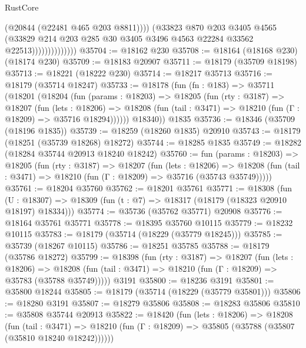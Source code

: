 \begin{lexlean}{RustCore}
\begin{coremodule}
                                (@20844 (@22481 @465 @203 @8811))))
                            (@33823
                              @870
                              @203
                              @3405
                              @4565
                              (@33829
                                @214
                                @203
                                @285
                                @30
                                @3405
                                @3496
                                @4563
                                @22284
                                @33562
                                @22513))))))))))))))
@35704 := @18162 @230
@35708 := @18164 (@18168 @230) (@18174 @230)
@35709 := @18183 @20907
@35711 := @18179 (@35709 @18198)
@35713 := @18221 (@18222 @230)
@35714 := @18217 @35713
@35716 := @18179 (@35714 @18247)
@35733 := @18178
    (fun (fn : @183) =>
    @35711
      (@18201
        (@18204
          (fun (params : @18203) =>
          @18205
            (fun (rty : @3187) =>
            @18207
              (fun (lets : @18206) =>
              @18208 (fun (tail : @3471) => @18210 (fun (Γ : @18209) => @35716 @18294))))))
        @18340))
    @1835
@35736 := @18346 (@35709 (@18196 @1835))
@35739 := @18259 (@18260 @1835) @20910
@35743 := @18179 (@18251 (@35739 @18268) @18272)
@35744 := @18285 @1835
@35749 := @18282 (@18284 @35744 @20913 @18240 @18242)
@35760 := fun (params : @18203) =>
  @18205
    (fun (rty : @3187) =>
    @18207
      (fun (lets : @18206) =>
      @18208 (fun (tail : @3471) => @18210 (fun (Γ : @18209) => @35716 (@35743 @35749)))))
@35761 := @18204 @35760
@35762 := @18201 @35761
@35771 := @18308
    (fun (U : @18307) => @18309 (fun (t : @7) => @18317 (@18179 (@18323 @20910 @18197) @18334)))
@35774 := @35736 (@35762 @35771) @20908
@35776 := @18164 @35761 @35771
@35778 := @18395 @35760 @10115
@35779 := @18232 @10115
@35783 := @18179 (@35714 (@18229 (@35779 @18245)))
@35785 := @35739 (@18267 @10115)
@35786 := @18251 @35785
@35788 := @18179 (@35786 @18272)
@35799 := @18398
    (fun (rty : @3187) =>
    @18207
      (fun (lets : @18206) =>
      @18208 (fun (tail : @3471) => @18210 (fun (Γ : @18209) => @35783 (@35788 @35749)))))
    @3191
@35800 := @18236 @3191
@35801 := @35800 @18244
@35805 := @18179 (@35714 (@18229 (@35779 @35801)))
@35806 := @18280 @3191
@35807 := @18279 @35806
@35808 := @18283 @35806
@35810 := @35808 @35744 @20913
@35822 := @18420
    (fun (lets : @18206) =>
    @18208
      (fun (tail : @3471) =>
      @18210 (fun (Γ : @18209) => @35805 (@35788 (@35807 (@35810 @18240 @18242))))))

\end{coremodule}
\end{lexlean}
